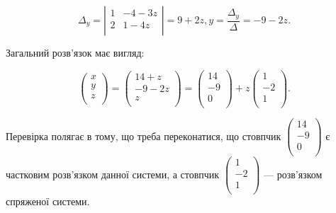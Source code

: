 $$\Delta_y = \left| \begin{matrix}
	1 & -4 -3z \\
	2 &  1 -4z \\
\end{matrix} \right| = 9 + 2z, y = \dfrac{\Delta_y}{\Delta} = -9 -2z.$$

Загальний розв’язок має вигляд:

$$\begin{pmatrix}
	x \\
	y \\
	z \\
\end{pmatrix} = \begin{pmatrix}
	14 + z \\
	-9 - 2z \\
	z \\
\end{pmatrix} = \begin{pmatrix}
	14 \\
	-9 \\
	 0 \\
\end{pmatrix} + z \begin{pmatrix}
	 1 \\
	-2 \\
	 1 \\
\end{pmatrix}.$$

Перевірка полягає в тому, що треба переконатися, що стовпчик $\begin{pmatrix}
	14 \\
	-9 \\
	 0 \\
\end{pmatrix}$ є
частковим розв’язком данної системи, а стовпчик $\begin{pmatrix}
	 1 \\
	-2 \\
	 1 \\
\end{pmatrix}$ --- розв’язком спряженої
системи. 




